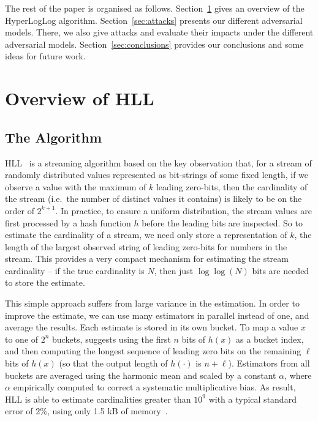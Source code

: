 \documentclass{IEEEtran}
\begin{document}
The rest of the paper is organised as follows. Section~\ref{sec:overview} gives an overview of the HyperLogLog algorithm. Section~\ref{sec:attacks} presents our different adversarial models. There, we also give attacks and evaluate their impacts under the different adversarial models. Section~\ref{sec:conclusions} provides our conclusions and some ideas for future work.


 
\section{Overview of HLL}\label{sec:overview}
\subsection{The Algorithm}
HLL~\cite{loglog,hll2} is a streaming algorithm based on the key observation that, for a stream of randomly distributed values represented as bit-strings of some fixed length, if we observe a value with the maximum of $k$ leading zero-bits, then the cardinality of the stream (i.e.\ the number of distinct values it contains) is likely to be on the order of $2^{k+1}$. In practice, to ensure a uniform distribution, the stream values are first processed by a hash function $h$ before the leading bits are inspected. So to estimate the cardinality of a stream, we need only store a representation of $k$, the length of the largest observed string of leading zero-bits for numbers in the stream. This provides a very compact mechanism for estimating the stream cardinality -- if the true cardinality is $N$, then just $\log\log(N)$ bits are needed to store the estimate. 

This simple approach suffers from large variance in the estimation. In order to improve the estimate, we can use many estimators in parallel instead of one, and average the results. Each estimate is stored in its own bucket. To map a value $x$ to one of $2^n$ buckets, \cite{loglog} suggests using the first $n$ bits of $h(x)$ as a bucket index, and then computing the longest sequence of leading zero bits on the remaining $\ell$ bits of $h(x)$ (so that the output length of $h(\cdot)$ is $n+\ell$). Estimators from all buckets are averaged using the harmonic mean and scaled by a constant $\alpha$, where $\alpha$ empirically computed to correct a systematic multiplicative bias. As result, HLL is able to estimate cardinalities greater than $10^9$ with a typical standard error of 2\%, using only 1.5 kB of memory~\cite{add-ref-for-this-claim}.
\end{document}
